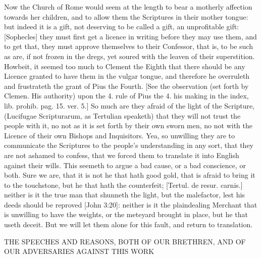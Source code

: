 {\par }{\IP Now the Church of Rome would seem at the length to bear a motherly affection towards her children, and to allow them the Scriptures in their mother tongue: but indeed it is a gift, not deserving to be called a gift, an unprofitable gift: [Sophecles] they must first get a licence in writing before they may use them, and to get that, they must approve themselves to their Confessor, that is, to be such as are, if not frozen in the dregs, yet soured with the leaven of their superstition. Howbeit, it seemed too much to Clement the Eighth that there should be any Licence granted to have them in the vulgar tongue, and therefore he overruleth and frustrateth the grant of Pius the Fourth. [See the observation (set forth by Clemen. His authority) upon the 4. rule of Pius the 4. his making in the index, lib. prohib. pag. 15. ver. 5.] So much are they afraid of the light of the Scripture, (Lucifugae Scripturarum, as Tertulian speaketh) that they will not trust the people with it, no not as it is set forth by their own sworn men, no not with the Licence of their own Bishops and Inquisitors. Yea, so unwilling they are to communicate the Scriptures to the people’s understanding in any sort, that they are not ashamed to confess, that we forced them to translate it into English against their wills. This seemeth to argue a bad cause, or a bad conscience, or both. Sure we are, that it is not he that hath good gold, that is afraid to bring it to the touchstone, but he that hath the counterfeit; [Tertul. de resur. carnis.] neither is it the true man that shunneth the light, but the malefactor, lest his deeds should be reproved [John 3:20]: neither is it the plaindealing Merchant that is unwilling to have the weights, or the meteyard brought in place, but he that useth deceit. But we will let them alone for this fault, and return to translation.
\par }{\IS THE SPEECHES AND REASONS, BOTH OF OUR BRETHREN, AND OF OUR ADVERSARIES AGAINST THIS WORK
}
